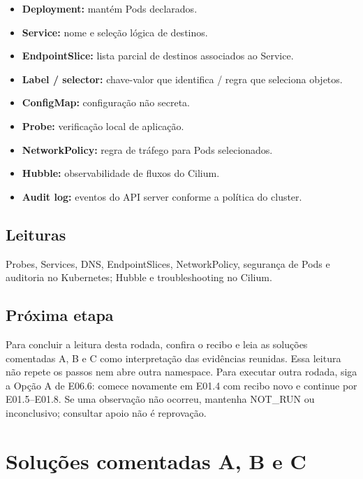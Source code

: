 \documentclass[12pt,openany,oneside,a4paper,chapter=TITLE,english,brazil]{abntex2}
\providecommand{\tightlist}{\setlength{\itemsep}{0pt}\setlength{\parskip}{0pt}}
\begin{document}
\begin{itemize}
\tightlist
\item
  \textbf{Deployment:} mantém Pods declarados.
\item
  \textbf{Service:} nome e seleção lógica de destinos.
\item
  \textbf{EndpointSlice:} lista parcial de destinos associados ao Service.
\item
  \textbf{Label / selector:} chave-valor que identifica / regra que seleciona objetos.
\item
  \textbf{ConfigMap:} configuração não secreta.
\item
  \textbf{Probe:} verificação local de aplicação.
\item
  \textbf{NetworkPolicy:} regra de tráfego para Pods selecionados.
\item
  \textbf{Hubble:} observabilidade de fluxos do Cilium.
\item
  \textbf{Audit log:} eventos do API server conforme a política do cluster.
\end{itemize}

\section*{Leituras}\label{leituras}

Probes, Services, DNS, EndpointSlices, NetworkPolicy, segurança de Pods e auditoria no Kubernetes; Hubble e troubleshooting no Cilium.

\section*{Próxima etapa}\label{pruxf3xima-etapa-4}

Para concluir a leitura desta rodada, confira o recibo e leia as soluções comentadas A, B e C como interpretação das evidências reunidas. Essa leitura não repete os passos nem abre outra namespace. Para executar outra rodada, siga a Opção A de E06.6: comece novamente em E01.4 com recibo novo e continue por E01.5--E01.8. Se uma observação não ocorreu, mantenha NOT\_RUN ou inconclusivo; consultar apoio não é reprovação.

\clearpage

\chapter*{Soluções comentadas A, B e C}
\end{document}
